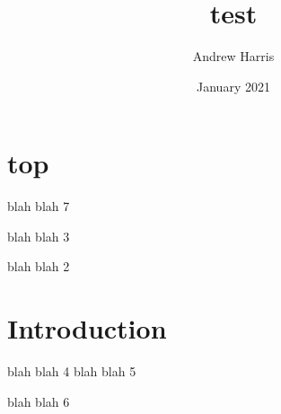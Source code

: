 \documentclass{article}
\title{test}
\author{Andrew Harris}
\date{January 2021}
\begin{document}
\maketitle
\section{top} 
blah blah 7

blah blah 3

blah blah 2


\section{Introduction}
blah blah 4
blah blah 5

blah blah 6
\end{document}
